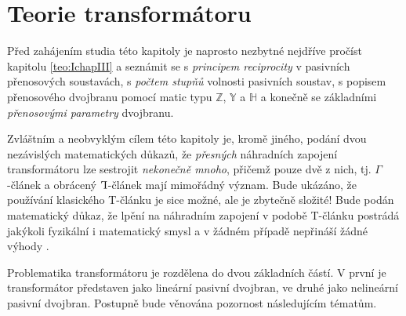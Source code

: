 \setchaptertoc
\chapter{Teorie transformátoru}\label{ES:kap_teorie_trafa}


  Před zahájením studia této kapitoly je naprosto nezbytné nejdříve pročíst kapitolu 
  \ref{teo:IchapIII} a seznámit se s \emph{principem reciprocity} v pasivních přenosových 
  soustavách, s \emph{počtem stupňů} volnosti pasivních soustav, s popisem přenosového dvojbranu 
  pomocí matic typu \(\mathbb{Z}\), \(\mathbb{Y}\) a \(\mathbb{H}\) a konečně se základními 
  \emph{přenosovými parametry} dvojbranu.
  
  Zvláštním a neobvyklým cílem této kapitoly je, kromě jiného, podání dvou nezávislých 
  matematických důkazů, že \emph{přesných} náhradních zapojení transformátoru lze sestrojit 
  \emph{nekonečně mnoho}, přičemž pouze dvě z nich, tj. \(\Gamma\)-článek a obrácený 
  \(\ammaG\)-článek mají mimořádný význam. Bude ukázáno, že používání klasického T-článku je sice 
  možné, ale je zbytečně složité! Bude podán matematický důkaz, že lpění na náhradním zapojení v 
  podobě T-článku postrádá jakýkoli fyzikální i matematický smysl a v žádném případě nepřináší 
  žádné výhody \cite[s.~340]{Patocka4}. 

  Problematika transformátoru je rozdělena do dvou základních částí. V první je transformátor  
  představen jako lineární pasivní dvojbran, ve druhé jako nelineární pasivní dvojbran. Postupně  
  bude věnována pozornost následujícím tématům.

